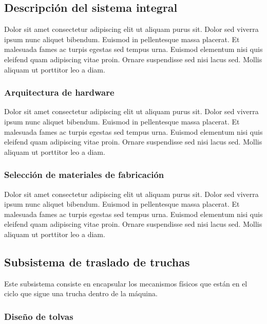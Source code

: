 \subsection{Descripción del sistema integral}

Dolor sit amet consectetur adipiscing elit ut aliquam purus sit. Dolor sed viverra ipsum nunc aliquet bibendum. Euismod in pellentesque massa placerat. Et malesuada fames ac turpis egestas sed tempus urna. Euismod elementum nisi quis eleifend quam adipiscing vitae proin. Ornare suspendisse sed nisi lacus sed. Mollis aliquam ut porttitor leo a diam.

\subsubsection{Arquitectura de hardware}

Dolor sit amet consectetur adipiscing elit ut aliquam purus sit. Dolor sed viverra ipsum nunc aliquet bibendum. Euismod in pellentesque massa placerat. Et malesuada fames ac turpis egestas sed tempus urna. Euismod elementum nisi quis eleifend quam adipiscing vitae proin. Ornare suspendisse sed nisi lacus sed. Mollis aliquam ut porttitor leo a diam.

\subsubsection{Selección de materiales de fabricación}

Dolor sit amet consectetur adipiscing elit ut aliquam purus sit. Dolor sed viverra ipsum nunc aliquet bibendum. Euismod in pellentesque massa placerat. Et malesuada fames ac turpis egestas sed tempus urna. Euismod elementum nisi quis eleifend quam adipiscing vitae proin. Ornare suspendisse sed nisi lacus sed. Mollis aliquam ut porttitor leo a diam.

\subsection{Subsistema de traslado de truchas}

Este subsistema consiste en encapsular los mecanismos físicos que están en el ciclo que sigue una trucha dentro de la máquina. 


\subsubsection{Diseño de tolvas}

